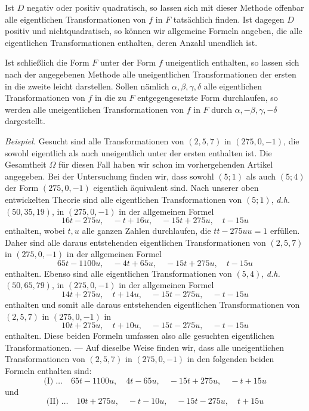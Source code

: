 Ist $D$ negativ oder positiv quadratisch, so lassen sich mit dieser Methode offenbar alle eigentlichen Transformationen von $f$ in $F$ tatsächlich finden. Ist dagegen $D$ positiv und nichtquadratisch, so können wir allgemeine Formeln angeben, die alle eigentlichen Transformationen enthalten, deren Anzahl unendlich ist.

Ist schließlich die Form $F$ unter der Form $f$ uneigentlich enthalten, so lassen sich nach der angegebenen Methode alle uneigentlichen Transformationen der ersten in die zweite leicht darstellen. Sollen nämlich $\alpha,\beta,\gamma,\delta$ alle eigentlichen Transformationen von $f$ in die zu $F$ entgegengesetzte Form durchlaufen, so werden alle uneigentlichen Transformationen von $f$ in $F$ durch $\alpha,-\beta,\gamma,-\delta$ dargestellt.

\textit{Beispiel.} Gesucht sind alle Transformationen von $(2,5,7)$ in $(275,0,-1)$, die sowohl eigentlich als auch uneigentlich unter der ersten enthalten ist. Die Gesamtheit $\Omega$ für diesen Fall haben wir schon im vorhergehenden Artikel angegeben. Bei der Untersuchung finden wir, dass sowohl $(5;1)$ als auch $(5;4)$ der Form $(275,0,-1)$ eigentlich äquivalent sind. Nach unserer oben entwickelten Theorie sind alle eigentlichen Transformationen von $(5;1)$, \textit{d.h.} $(50,35,19)$, in $(275,0,-1)$ in der allgemeinen Formel
\[
16t-275u,\quad -t+16u,\quad -15t+275u,\quad t-15u
\]
enthalten, wobei $t,u$ alle ganzen Zahlen durchlaufen, die $tt-275uu=1$
erfüllen. Daher sind alle daraus entstehenden eigentlichen Transformationen von $(2,5,7)$ in $(275,0,-1)$ in der allgemeinen Formel
\[
65t-1100u,\quad -4t+65u,\quad -15t+275u,\quad t-15u
\]
enthalten. Ebenso sind alle eigentlichen Transformationen von $(5,4)$, \textit{d.h.} $(50,65,79)$, in $(275,0,-1)$ in der allgemeinen Formel
\[
14t+275u,\quad t+14u,\quad -15t-275u,\quad -t-15u
\]
enthalten und somit alle daraus entstehenden eigentlichen Transformationen von $(2,5,7)$ in $(275,0,-1)$ in
\[
10t+275u,\quad t+10u,\quad -15t-275u,\quad -t-15u
\]
enthalten. Diese beiden Formeln umfassen also alle gesuchten eigentlichen Transformationen. --- Auf dieselbe Weise finden wir, dass alle uneigentlichen Transformationen von $(2,5,7)$ in $(275,0,-1)$ in den folgenden beiden Formeln enthalten sind:
\[
\text{(I)}\;\ldots\quad 65t-1100u,\quad 4t-65u,\quad -15t+275u,\quad -t+15u
\]
und
\[
\text{(II)}\;\ldots\quad 10t+275u,\quad -t-10u,\quad -15t-275u,\quad t+15u
\]

